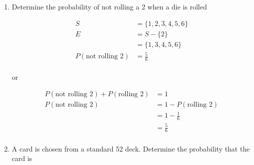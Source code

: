 \documentclass[../../Main.tex]{subfiles}
\begin{document}
\begin{example}
\begin{enumerate}
        \item
        {
            Determine the probability of not rolling a 2 when a die is rolled

            \begin{align*}
                S &= \{1, 2, 3, 4, 5, 6\} \\
                E &= S - \{2\} \\
                &= \{1, 3, 4, 5, 6\} \\
                P(\text{not rolling 2}) &= \boxed{\frac{5}{6}} \\
            \end{align*}

            or

            \begin{align*}
                P(\text{not rolling 2}) + P(\text{rolling 2}) &= 1 \\
                P(\text{not rolling 2}) &= 1 - P(\text{rolling 2}) \\
                &= 1 - \frac{1}{6} \\
                &= \boxed{\frac{5}{6}} \\
            \end{align*}
        } 

        \item
        {
            A card is chosen from a standard 52 deck. Determine the probability that the card is

            }
\end{enumerate}
\end{example}
\end{document}
